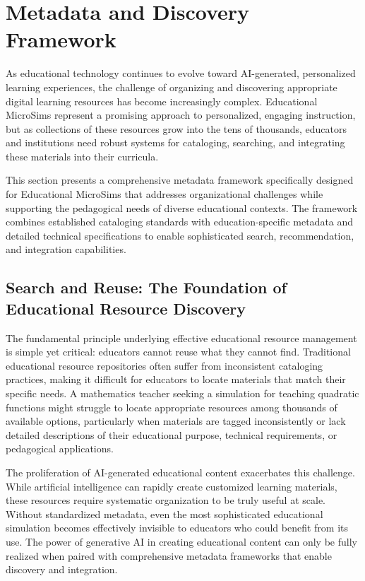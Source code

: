 \section{Metadata and Discovery Framework}
\label{sec:metadata}

As educational technology continues to evolve toward AI-generated, personalized learning experiences, the challenge of organizing and discovering appropriate digital learning resources has become increasingly complex. Educational MicroSims represent a promising approach to personalized, engaging instruction, but as collections of these resources grow into the tens of thousands, educators and institutions need robust systems for cataloging, searching, and integrating these materials into their curricula.

This section presents a comprehensive metadata framework specifically designed for Educational MicroSims that addresses organizational challenges while supporting the pedagogical needs of diverse educational contexts. The framework combines established cataloging standards with education-specific metadata and detailed technical specifications to enable sophisticated search, recommendation, and integration capabilities.

\subsection{Search and Reuse: The Foundation of Educational Resource Discovery}

The fundamental principle underlying effective educational resource management is simple yet critical: educators cannot reuse what they cannot find. Traditional educational resource repositories often suffer from inconsistent cataloging practices, making it difficult for educators to locate materials that match their specific needs. A mathematics teacher seeking a simulation for teaching quadratic functions might struggle to locate appropriate resources among thousands of available options, particularly when materials are tagged inconsistently or lack detailed descriptions of their educational purpose, technical requirements, or pedagogical applications.

The proliferation of AI-generated educational content exacerbates this challenge. While artificial intelligence can rapidly create customized learning materials, these resources require systematic organization to be truly useful at scale. Without standardized metadata, even the most sophisticated educational simulation becomes effectively invisible to educators who could benefit from its use. The power of generative AI in creating educational content can only be fully realized when paired with comprehensive metadata frameworks that enable discovery and integration.

